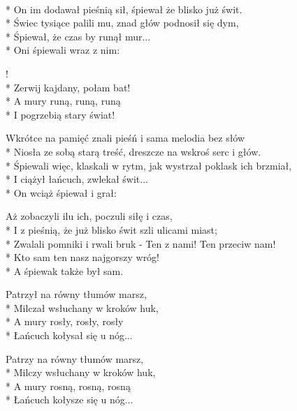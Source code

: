 \begin{lyrics}[longestline={Śpiewali więc, klaskali w rytm, jak wystrzał poklask ich brzmiał,}]

\\*
On im dodawał pieśnią sił, śpiewał że blisko już świt.\\*
Świec tysiące palili mu, znad głów podnosił się dym,\\*
Śpiewał, że czas by runął mur...\\*
Oni śpiewali wraz z nim:

\begin{chorus}
!\\*
Zerwij kajdany, połam bat!\\*
A mury runą, runą, runą\\*
I pogrzebią stary świat!
\end{chorus}

Wkrótce na pamięć znali pieśń i sama melodia bez słów\\*
Niosła ze sobą starą treść, dreszcze na wskroś serc i głów.\\*
Śpiewali więc, klaskali w rytm, jak wystrzał poklask ich brzmiał,\\*
I ciążył łańcuch, zwlekał świt...\\*
On wciąż śpiewał i grał:

\chorusref

Aż zobaczyli ilu ich, poczuli siłę i czas,\\*
I z pieśnią, że już blisko świt szli ulicami miast;\\*
Zwalali pomniki i rwali bruk - Ten z nami! Ten przeciw nam!\\*
Kto sam ten nasz najgorszy wróg!\\*
A śpiewak także był sam.

Patrzył na równy tłumów marsz,\\*
Milczał wsłuchany w kroków huk,\\*
A mury rosły, rosły, rosły\\*
Łańcuch kołysał się u nóg...

Patrzy na równy tłumów marsz,\\*
Milczy wsłuchany w kroków huk,\\*
A mury rosną, rosną, rosną\\*
Łańcuch kołysze się u nóg...
\end{lyrics}



